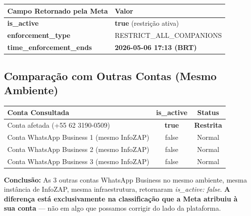 \documentclass[12pt, a4paper]{article}
\begin{document}
\begin{table}[H]
    \centering
    \renewcommand{\arraystretch}{1.5}
    \begin{tabularx}{\textwidth}{l X}
        \toprule
        \rowcolor{tableHeader} \textbf{Campo Retornado pela Meta} & \textbf{Valor} \\
        \midrule
        \textbf{is\_active} & \textcolor{accentColor}{\textbf{true}} (restrição ativa) \\
        \rowcolor{lightGray}
        \textbf{enforcement\_type} & RESTRICT\_ALL\_COMPANIONS \\
        \textbf{time\_enforcement\_ends} & \textbf{2026-05-06 17:13 (BRT)} \\
        \bottomrule
    \end{tabularx}
\end{table}

\subsection{Comparação com Outras Contas (Mesmo Ambiente)}

\begin{table}[H]
    \centering
    \renewcommand{\arraystretch}{1.4}
    \begin{tabularx}{\textwidth}{X c c}
        \toprule
        \rowcolor{tableHeader} \textbf{Conta Consultada} & \textbf{is\_active} & \textbf{Status} \\
        \midrule
        Conta afetada (+55 62 3190-0509) & \textcolor{accentColor}{\textbf{true}} & \textbf{Restrita} \\
        \rowcolor{lightGray}
        Conta WhatsApp Business 1 (mesmo InfoZAP) & false & Normal \\
        Conta WhatsApp Business 2 (mesmo InfoZAP) & false & Normal \\
        \rowcolor{lightGray}
        Conta WhatsApp Business 3 (mesmo InfoZAP) & false & Normal \\
        \bottomrule
    \end{tabularx}
\end{table}

\textcolor{primaryColor}{\textbf{Conclusão:}} As 3 outras contas WhatsApp Business no mesmo ambiente, mesma instância de InfoZAP, mesma infraestrutura, retornaram \textit{is\_active: false}. \textbf{A diferença está exclusivamente na classificação que a Meta atribuiu à sua conta} --- não em algo que possamos corrigir do lado da plataforma.
\end{document}
